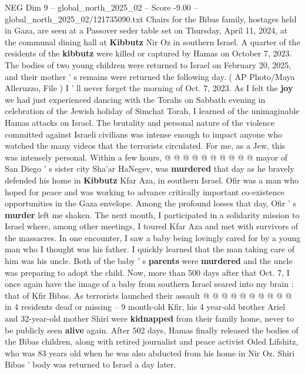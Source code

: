 \begin{textsample}{NEG Dim 9 – global\_north\_2025\_02 – Score -9.00 – global\_north\_2025\_02/121735090.txt}  \label{ex:f9_neg_060}
Chairs for the Bibas family, hostages held in Gaza, are seen at a Passover seder table set on Thursday, April 11, 2024, at the communal dining hall at \textbf{Kibbutz} Nir Oz in southern Israel.
A quarter of the residents of the \textbf{kibbutz} were killed or captured by Hamas on October 7, 2023.
The bodies of two young children were returned to Israel on February 20, 2025, and their mother ' s remains were returned the following day. ( AP Photo/Maya Alleruzzo, File ) I ' ll never forget the morning of Oct. 7, 2023.
As I felt the \textbf{joy} we had just experienced dancing with the Torahs on Sabbath evening in celebration of the Jewish holiday of Simchat Torah, I learned of the unimaginable Hamas attacks on Israel.
The brutality and personal nature of the violence committed against Israeli civilians was intense enough to impact anyone who watched the many videos that the terrorists circulated.
For me, as a Jew, this was intensely personal.
Within a few hours, @ @ @ @ @ @ @ @ @ @ mayor of San Diego ' s sister city Sha'ar HaNegev, was \textbf{murdered} that day as he bravely defended his home in \textbf{Kibbutz} Kfar Aza, in southern Israel.
Ofir was a man who hoped for peace and was working to advance critically important co-existence opportunities in the Gaza envelope.
Among the profound losses that day, Ofir ' s \textbf{murder} left me shaken.
The next month, I participated in a solidarity mission to Israel where, among other meetings, I toured Kfar Aza and met with survivors of the massacres.
In one encounter, I saw a baby being lovingly cared for by a young man who I thought was his father.
I quickly learned that the man taking care of him was his uncle.
Both of the baby ' s \textbf{parents} were \textbf{murdered} and the uncle was preparing to adopt the child.
Now, more than 500 days after that Oct. 7, I once again have the image of a baby from southern Israel seared into my brain : that of Kfir Bibas.
As terrorists launched their assault @ @ @ @ @ @ @ @ @ @ in 4 residents dead or missing -- 9 month-old Kfir, his 4 year-old brother Ariel and 32-year-old mother Shiri were \textbf{kidnapped} from their family home, never to be publicly seen \textbf{alive} again.
After 502 days, Hamas finally released the bodies of the Bibas children, along with retired journalist and peace activist Oded Lifshitz, who was 83 years old when he was also abducted from his home in Nir Oz.
Shiri Bibas ' body was returned to Israel a day later.

\end{textsample}
